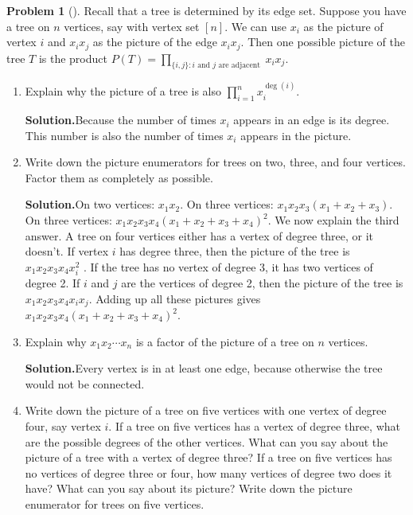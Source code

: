 \documentclass[10pt,]{book}
\theoremstyle{plain}
\theoremstyle{definition}
\newtheorem{activity}[project]{Problem}
\theoremstyle{definition}
\numberwithin{equation}{chapter}
\begin{document}
\begin{activity}[]\label{activity-199}
Recall that a tree is determined by its edge set. Suppose you have a tree on \(n\) vertices, say with vertex set \([n]\). We can use \(x_i\) as the picture of vertex \(i\) and \(x_ix_j\) as the picture of the edge \(x_ix_j\). Then one possible picture of the tree \(T\) is the product \(P(T) = \prod_{\{i,j\}:i\text{ and }j\text{ are adjacent }}x_ix_j\).%
\begin{enumerate}[font=\bfseries,label=(\alph*),ref=\alph*]
\item\label{task-129} Explain why the picture of a tree is also \(\prod_{i=1}^nx_i^{\deg(i)}\).%
\par\medskip\noindent%
\textbf{Solution.}\quad Because the number of times \(x_i\) appears in an edge is its degree. This number is also the number of times \(x_i\) appears in the picture.%
\item\label{task-130} Write down the picture enumerators for trees on two, three, and four vertices. Factor them as completely as possible.%
\par\medskip\noindent%
\textbf{Solution.}\quad On two vertices: \(x_1x_2\). On three vertices: \(x_1x_2x_3(x_1 + x_2 + x_3)\). On three vertices: \(x_1x_2x_3x_4(x_1 + x_2 + x_3 + x_4)^2\). We now explain the third answer. A tree on four vertices either has a vertex of degree three, or it doesn't. If vertex \(i\) has degree three, then the picture of the tree is \(x_1x_2x_3x_4x_i^2\) . If the tree has no vertex of degree 3, it has two vertices of degree 2. If \(i\) and \(j\) are the vertices of degree 2, then the picture of the tree is \(x_1x_2x_3x_4x_ix_j\). Adding up all these pictures gives \(x_1x_2x_3x_4(x_1 + x_2 + x_3 + x_4)^2\).%
\item\label{task-131} Explain why \(x_1x_2\cdots x_n\) is a factor of the picture of a tree on \(n\) vertices.%
\par\medskip\noindent%
\textbf{Solution.}\quad Every vertex is in at least one edge, because otherwise the tree would not be connected.%
\item\label{task-132} Write down the picture of a tree on five vertices with one vertex of degree four, say vertex \(i\). If a tree on five vertices has a vertex of degree three, what are the possible degrees of the other vertices. What can you say about the picture of a tree with a vertex of degree three? If a tree on five vertices has no vertices of degree three or four, how many vertices of degree two does it have? What can you say about its picture? Write down the picture enumerator for trees on five vertices.%

\end{enumerate}
\end{activity}
\end{document}
